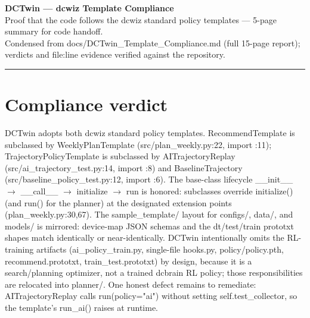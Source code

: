 \documentclass[10pt]{article}
\begin{document}
\begin{center}
{\LARGE\bfseries\color{nv} DCTwin --- dcwiz Template Compliance}\\[3pt]
{\normalsize Proof that the code follows the dcwiz standard policy templates --- 5-page summary for code handoff.}\\[1pt]
{\small Condensed from docs/DCTwin\_Template\_Compliance.md (full 15-page report); verdicts and file:line evidence verified against the repository.}
\end{center}
\vspace{2pt}\hrule\vspace{4pt}
\section*{Compliance verdict}
DCTwin adopts both dcwiz standard policy templates. RecommendTemplate is subclassed by WeeklyPlanTemplate (src/\allowbreak{}plan\_\allowbreak{}weekly.py:22, import :11); TrajectoryPolicyTemplate is subclassed by AITrajectoryReplay (src/\allowbreak{}ai\_\allowbreak{}trajectory\_\allowbreak{}test.py:14, import :8) and BaselineTrajectory (src/\allowbreak{}baseline\_\allowbreak{}policy\_\allowbreak{}test.py:12, import :6). The base-class lifecycle \_\allowbreak{}\_\allowbreak{}init\_\allowbreak{}\_\allowbreak{} $\rightarrow$ \_\allowbreak{}\_\allowbreak{}call\_\allowbreak{}\_\allowbreak{} $\rightarrow$ initialize $\rightarrow$ run is honored: subclasses override initialize() (and run() for the planner) at the designated extension points (plan\_\allowbreak{}weekly.py:30,67). The sample\_\allowbreak{}template/\allowbreak{} layout for configs/\allowbreak{}, data/\allowbreak{}, and models/\allowbreak{} is mirrored: device-map JSON schemas and the dt/\allowbreak{}test/\allowbreak{}train prototxt shapes match identically or near-identically. DCTwin intentionally omits the RL-training artifacts (ai\_\allowbreak{}policy\_\allowbreak{}train.py, single-file hooks.py, policy/\allowbreak{}policy.pth, recommend.prototxt, train\_\allowbreak{}test.prototxt) by design, because it is a search/\allowbreak{}planning optimizer, not a trained dcbrain RL policy; those responsibilities are relocated into planner/\allowbreak{}. One honest defect remains to remediate: AITrajectoryReplay calls run(policy="ai") without setting self.test\_\allowbreak{}collector, so the template's run\_\allowbreak{}ai() raises at runtime.
\end{document}
